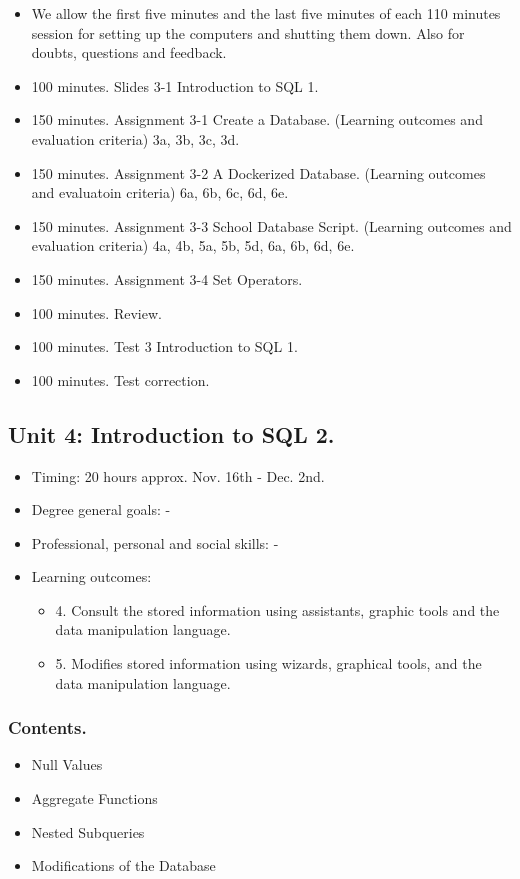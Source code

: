 \documentclass[catalan, a4paper, 12pt, titlepage]{article}
\begin{document}
  \begin{itemize}
          \item We allow the first five minutes and the last five minutes of each 110 minutes session for setting up the computers and shutting them down. Also for doubts, questions and feedback.
	  \item 100 minutes. Slides 3-1 Introduction to SQL 1.
	  \item 150 minutes. Assignment 3-1 Create a Database. (\faGraduationCap Learning outcomes and evaluation criteria) 3a, 3b, 3c, 3d.
	  \item 150 minutes. Assignment 3-2 A Dockerized Database. (\faGraduationCap Learning outcomes and evaluatoin criteria) 6a, 6b, 6c, 6d, 6e.
	  \item 150 minutes. Assignment 3-3 School Database Script. (\faGraduationCap Learning outcomes and evaluation criteria) 4a, 4b, 5a, 5b, 5d, 6a, 6b, 6d, 6e.
	  \item 150 minutes. Assignment 3-4 Set Operators.
	  \item 100 minutes. Review.
	  \item 100 minutes. Test 3 Introduction to SQL 1.
	  \item 100 minutes. Test correction.
  \end{itemize}

  \subsection{Unit 4: Introduction to SQL 2.}

  \begin{itemize}
	\item Timing: 20 hours approx. Nov. 16th - Dec. 2nd.
	\item Degree general goals: -
	\item Professional, personal and social skills: -
	\item Learning outcomes: 
		\begin{itemize}
			\item 4. Consult the stored information using assistants, graphic tools and the data manipulation language.
			\item 5. Modifies stored information using wizards, graphical tools, and the data manipulation language.
		\end{itemize}
  \end{itemize}

  \subsubsection{Contents.}
  \begin{itemize}
	  \item Null Values
	  \item Aggregate Functions 
	  \item Nested Subqueries
	  \item Modifications of the Database
  \end{itemize}
  
\end{document}

